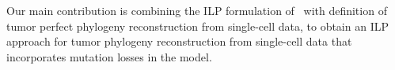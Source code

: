 \documentclass[a4paper,USenglish]{article}
\theoremstyle{definition}
\newtheorem{definition}{Definition}
\begin{document}
Our main contribution is combining the ILP formulation
of~\cite{Bonizzoni:2017:BPP:3107411.3107441} with definition of tumor perfect phylogeny
reconstruction from single-cell data, to obtain an ILP approach for tumor phylogeny
reconstruction from single-cell data that incorporates mutation losses in the model.






 
  
\end{document}
